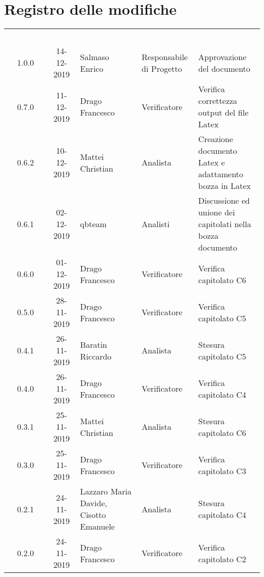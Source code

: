 \section*{Registro delle modifiche}
{
\renewcommand{\arraystretch}{1.5}
\centering
\begin{longtable}{ c c  C{4cm}  C{3cm} C{4cm}}
\textcolor{white}{\textbf{Versione}} & \textcolor{white}{\textbf{Data}} & \textcolor{white}{\textbf{Nominativo}} & \textcolor{white}{\textbf{Ruolo}} & \textcolor{white}{\textbf{Descrizione}}\\	

1.0.0 & 14-12-2019 & Salmaso Enrico & Responsabile di Progetto & Approvazione del documento \\	

0.7.0 & 11-12-2019 & Drago Francesco & Verificatore & Verifica correttezza output del file Latex \\

0.6.2 & 10-12-2019 & Mattei Christian & Analista & Creazione documento Latex e adattamento bozza in Latex \\

0.6.1 & 02-12-2019 & qbteam & Analisti & Discussione ed unione dei capitolati nella bozza documento \\

0.6.0 & 01-12-2019 & Drago Francesco & Verificatore & Verifica capitolato C6 \\

0.5.0 & 28-11-2019 & Drago Francesco & Verificatore & Verifica capitolato C5 \\

0.4.1 & 26-11-2019 & Baratin Riccardo & Analista & Stesura capitolato C5 \\

0.4.0 & 26-11-2019 & Drago Francesco & Verificatore & Verifica capitolato C4 \\

0.3.1 & 25-11-2019 & Mattei Christian & Analista & Stesura capitolato C6 \\

0.3.0 & 25-11-2019 & Drago Francesco & Verificatore & Verifica capitolato C3 \\

0.2.1 & 24-11-2019 & Lazzaro Maria Davide, Cisotto Emanuele & Analista & Stesura capitolato C4 \\

0.2.0 & 24-11-2019 & Drago Francesco & Verificatore & Verifica capitolato C2 \\


\end{longtable}}
